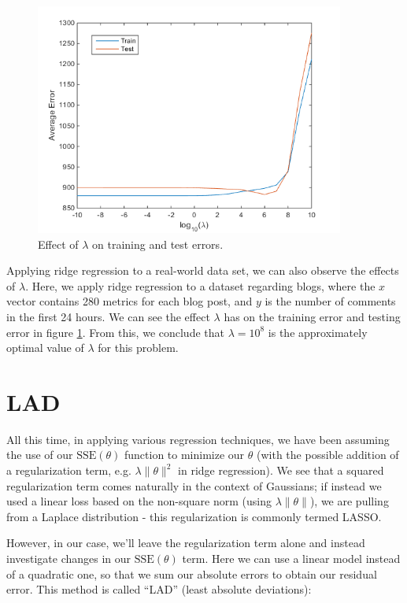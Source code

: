 \documentclass[10pt,letterpaper]{article}
\begin{document}
\begin{figure}[!h]
\begin{center}
\includegraphics[width=4in]{figures/blogData.png}
\caption{Effect of $\lambda$ on training and test errors.}\label{fig:blogData}
\end{center}
\end{figure}
Applying ridge regression to a real-world data set, we can also observe the effects of $\lambda$. Here, we apply ridge regression to a dataset regarding blogs, where the $x$ vector contains 280 metrics for each blog post, and $y$ is the number of comments in the first 24 hours. We can see the effect $\lambda$ has on the training error and testing error in figure \ref{fig:blogData}. From this, we conclude that $\lambda=10^8$ is the approximately optimal value of $\lambda$ for this problem.\\

\section{LAD}
All this time, in applying various regression techniques, we have been assuming the use of our $\text{SSE}(\theta)$ function to minimize our $\theta$ (with the possible addition of a regularization term, e.g. $\lambda\lVert\theta\rVert^2$ in ridge regression). We see that a squared regularization term comes naturally in the context of Gaussians; if instead we used a linear loss based on the non-square norm (using $\lambda\lVert\theta\rVert$), we are pulling from a Laplace distribution - this regularization is commonly termed LASSO.

However, in our case, we'll leave the regularization term alone and instead investigate changes in our $\text{SSE}(\theta)$ term. Here we can use a linear model instead of a quadratic one, so that we sum our absolute errors to obtain our residual error. This method is called ``LAD'' (least absolute deviations):
\end{document}
